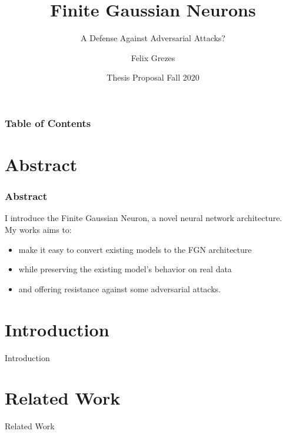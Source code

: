 \documentclass{beamer}
\title[FGNs vs Adversarial Attacks] %
{Finite Gaussian Neurons}
\subtitle{A Defense Against Adversarial Attacks?}
\author[Felix Grezes] %
{Felix Grezes}
\institute[CUNY GC] %
{
  \inst{}%
  Graduate Center\\
  City University of New York
}
\date[Thesis Proposal - Fall 2020] %
{Thesis Proposal Fall 2020}
\begin{document}
\frame{\titlepage}

\begin{frame}
\frametitle{Table of Contents}
\tableofcontents
\end{frame}


\section{Abstract}

\begin{frame}
\frametitle{Abstract}
I introduce the Finite Gaussian Neuron, a novel neural network architecture.\\

My works aims to:
\begin{itemize}
    \item make it easy to convert existing models to the FGN architecture
    \item while preserving the existing model's behavior on real data
    \item and offering resistance against some adversarial attacks.
\end{itemize}

\end{frame}


\section{Introduction}

\begin{frame}{Introduction}
    
\end{frame}


\section{Related Work}

\begin{frame}{Related Work}
    
\end{frame}
\end{document}
